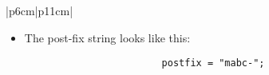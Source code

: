 \begin{center}
\begin{longtable}{ |p{6cm}|p{11cm}| }
\begin{itemize}
            \item The post-fix string looks like this: 
                {
                    \begin{verbatim}
                        postfix = "mabc-";
                    \end{verbatim}
                }
        \end{itemize}
            \\
        \hline
        \hline
             \\
        

\end{longtable}
\end{center}
